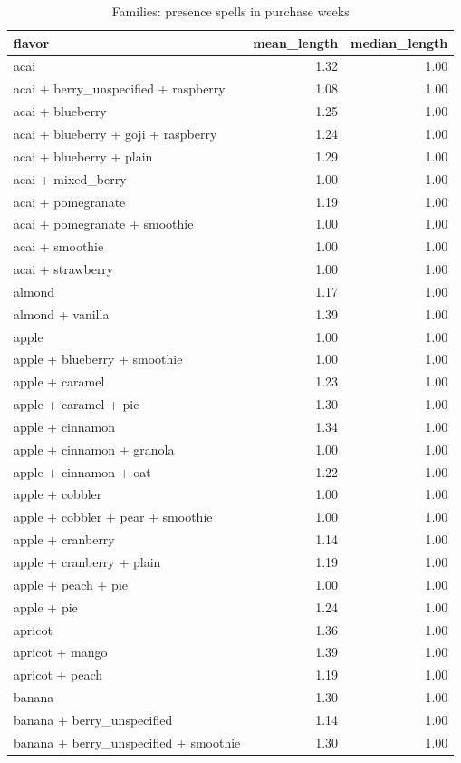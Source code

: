 \begin{table}
\caption{Families: presence spells in purchase weeks}
\begin{tabular}{lrr}
\toprule
flavor & mean\_length & median\_length \\
\midrule
acai & 1.32 & 1.00 \\
acai + berry\_unspecified + raspberry & 1.08 & 1.00 \\
acai + blueberry & 1.25 & 1.00 \\
acai + blueberry + goji + raspberry & 1.24 & 1.00 \\
acai + blueberry + plain & 1.29 & 1.00 \\
acai + mixed\_berry & 1.00 & 1.00 \\
acai + pomegranate & 1.19 & 1.00 \\
acai + pomegranate + smoothie & 1.00 & 1.00 \\
acai + smoothie & 1.00 & 1.00 \\
acai + strawberry & 1.00 & 1.00 \\
almond & 1.17 & 1.00 \\
almond + vanilla & 1.39 & 1.00 \\
apple & 1.00 & 1.00 \\
apple + blueberry + smoothie & 1.00 & 1.00 \\
apple + caramel & 1.23 & 1.00 \\
apple + caramel + pie & 1.30 & 1.00 \\
apple + cinnamon & 1.34 & 1.00 \\
apple + cinnamon + granola & 1.00 & 1.00 \\
apple + cinnamon + oat & 1.22 & 1.00 \\
apple + cobbler & 1.00 & 1.00 \\
apple + cobbler + pear + smoothie & 1.00 & 1.00 \\
apple + cranberry & 1.14 & 1.00 \\
apple + cranberry + plain & 1.19 & 1.00 \\
apple + peach + pie & 1.00 & 1.00 \\
apple + pie & 1.24 & 1.00 \\
apricot & 1.36 & 1.00 \\
apricot + mango & 1.39 & 1.00 \\
apricot + peach & 1.19 & 1.00 \\
banana & 1.30 & 1.00 \\
banana + berry\_unspecified & 1.14 & 1.00 \\
banana + berry\_unspecified + smoothie & 1.30 & 1.00 \\

\end{tabular}
\end{table}
